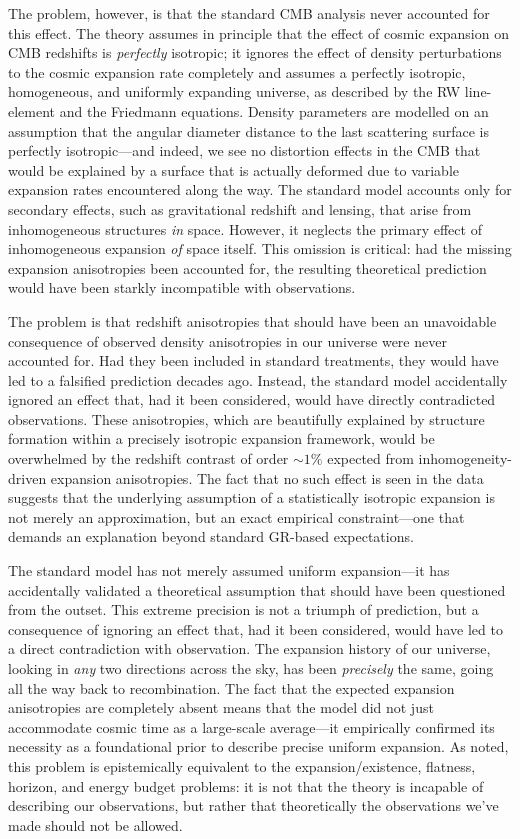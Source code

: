 \documentclass[aps,prd,reprint,superscriptaddress]{revtex4-2}
\begin{document}
The problem, however, is that the standard CMB analysis never accounted for this effect. The theory assumes in principle that the effect of cosmic expansion on CMB redshifts is \textit{perfectly} isotropic; it ignores the effect of density perturbations to the cosmic expansion rate completely and assumes a perfectly isotropic, homogeneous, and uniformly expanding universe, as described by the RW line-element and the Friedmann equations. Density parameters are modelled on an assumption that the angular diameter distance to the last scattering surface is perfectly isotropic---and indeed, we see no distortion effects in the CMB that would be explained by a surface that is actually deformed due to variable expansion rates encountered along the way. The standard model accounts only for secondary effects, such as gravitational redshift and lensing, that arise from inhomogeneous structures \textit{in} space. However, it neglects the primary effect of inhomogeneous expansion \textit{of} space itself. This omission is critical: had the missing expansion anisotropies been accounted for, the resulting theoretical prediction would have been starkly incompatible with observations. 

The problem is that redshift anisotropies that should have been an unavoidable consequence of observed density anisotropies in our universe were never accounted for. Had they been included in standard treatments, they would have led to a falsified prediction decades ago. Instead, the standard model accidentally ignored an effect that, had it been considered, would have directly contradicted observations. These anisotropies, which are beautifully explained by structure formation within a precisely isotropic expansion framework, would be overwhelmed by the redshift contrast of order $\sim1\%$ expected from inhomogeneity-driven expansion anisotropies. The fact that no such effect is seen in the data suggests that the underlying assumption of a statistically isotropic expansion is not merely an approximation, but an exact empirical constraint---one that demands an explanation beyond standard GR-based expectations.

The standard model has not merely assumed uniform expansion---it has accidentally validated a theoretical assumption that should have been questioned from the outset. This extreme precision is not a triumph of prediction, but a consequence of ignoring an effect that, had it been considered, would have led to a direct contradiction with observation. The expansion history of our universe, looking in \textit{any} two directions across the sky, has been \textit{precisely} the same, going all the way back to recombination. The fact that the expected expansion anisotropies are completely absent means that the model did not just accommodate cosmic time as a large-scale average---it empirically confirmed its necessity as a foundational prior to describe precise uniform expansion. As noted, this problem is epistemically equivalent to the expansion/existence, flatness, horizon, and energy budget problems: it is not that the theory is incapable of describing our observations, but rather that theoretically the observations we've made should not be allowed.
\end{document}
